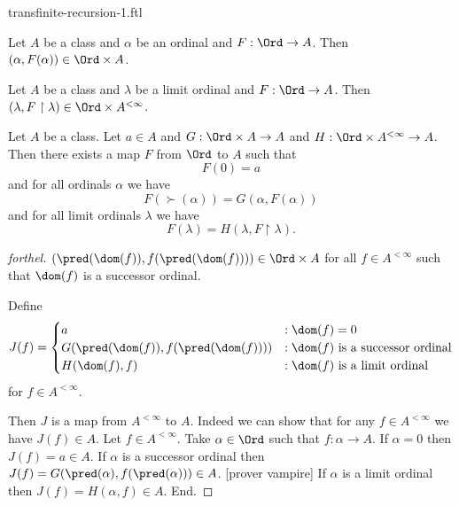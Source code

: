\documentclass{naproche-library}
\begin{document}
\begin{smodule}{transfinite-recursion-1.ftl}

  \begin{lemma*}[forthel,id=transfinite-recursion_029348573987483]
    Let $A$ be a class and $\alpha$ be an ordinal and $F : \Ord \to A$.
    Then $(\alpha, F(\alpha)) \in \Ord \times A$.
  \end{lemma*}

  \begin{lemma*}[forthel,id=transfinite-recursion_570293857449281]
    Let $A$ be a class and $\lambda$ be a limit ordinal and $F : \Ord \to A$.
    Then $(\lambda, F \restriction \lambda) \in \Ord \times A^{< \infty}$.
  \end{lemma*}
  
  \begin{corollary*}[forthel,id=transfinite-recursion_298647309184593]
    Let $A$ be a class.
    Let $a \in A$ and $G : \Ord \times A \to A$ and $H : \Ord \times A^{< \infty} \to A$.
    Then there exists a map $F$ from $\Ord$ to $A$ such that
    \[ F(0) = a \]
    and for all ordinals $\alpha$ we have
    \[ F(\succ(\alpha)) = G(\alpha, F(\alpha)) \]
    and for all limit ordinals $\lambda$ we have
    \[ F(\lambda) = H(\lambda, F \restriction \lambda). \]
  \end{corollary*}
  \begin{proof}[forthel]
    $(\pred(\dom(f)), f(\pred(\dom(f)))) \in \Ord \times A$ for all $f \in A^{< \infty}$ such that $\dom(f)$ is a successor ordinal.

    Define  \[ J(f) =
      \begin{cases}
        a
        & : \dom(f) = 0
        \\
        G(\pred(\dom(f)), f(\pred(\dom(f))))
        & : \text{$\dom(f)$ is a successor ordinal}
        \\
        H(\dom(f), f)
        & : \text{$\dom(f)$ is a limit ordinal}
      \end{cases} \]
    for $f \in A^{< \infty}$.

    Then $J$ is a map from $A^{< \infty}$ to $A$.
    Indeed we can show that for any $f \in A^{< \infty}$ we have $J(f) \in A$.
      Let $f \in A^{< \infty}$.
      Take $\alpha \in \Ord$ such that $f : \alpha \to A$.
      If $\alpha = 0$ then $J(f) = a \in A$.
      If $\alpha$ is a successor ordinal then $J(f) =
      G(\pred(\alpha), f(\pred(\alpha))) \in A$.
      [prover vampire]
      If $\alpha$ is a limit ordinal then $J(f) = H(\alpha, f) \in A$.
    End.


\end{proof}
\end{smodule}
\end{document}

